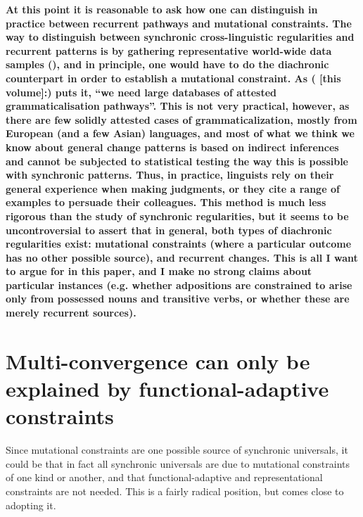 \documentclass[output=paper]{langsci/langscibook}
\begin{document}
\textbf{{At this point it is reasonable to ask how one can distinguish in practice between recurrent pathways and mutational constraints. The way to distinguish between synchronic cross-linguistic regularities and recurrent patterns is by gathering representative world-wide data samples (), and in principle, one would have to do the diachronic counterpart in order to establish a mutational constraint. As \citeauthor{Collins2019tv} (\citeyear{Collins2019tv} [this volume]:\pageref{pg:collins:refforhaspelmath}) puts it, “we need large databases of \textbf{{attested grammaticalisation pathways”}}. This is not very practical, however, as there are few solidly attested cases of grammaticalization, mostly from European (and a few Asian) languages, and most of what we think we know about general change patterns is based on indirect inferences and cannot be subjected to statistical testing the way this is possible with synchronic patterns. Thus, in practice, linguists rely on their general experience when making judgments, or they cite a range of examples to persuade their colleagues. This method is much less rigorous than the study of synchronic regularities, but it seems to be uncontroversial to assert that in general, both types of diachronic regularities exist: mutational constraints (where a particular outcome has no other possible source), and recurrent changes. This is all I want to argue for in this paper, and I make no strong claims about particular instances (e.g. whether adpositions are constrained to arise only from possessed nouns and transitive verbs, or whether these are merely recurrent sources).} }
 

\section{Multi-convergence can only be explained by functional-adaptive constraints}\label{sec:haspelmath:5}

Since mutational constraints are one possible source of synchronic universals, it could be that in fact all synchronic universals are due to mutational constraints of one kind or another, and that functional-adaptive and representational constraints are not needed. This is a fairly radical position, but \citet{Cristofaro2017} comes close to adopting it.
\end{document}
